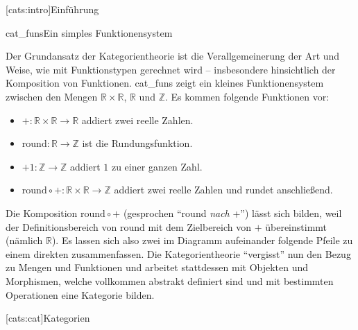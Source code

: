 \documentclass[11pt, a4paper, bibgerm]{scrbook}
\newcommand\lsection{}
\newcommand\abb{}
\newcommand\fig{}
\newcommand\ato{\rightarrow} %
\begin{document}
\lsection[cats:intro]{Einführung}

\fig{cat_funs}{Ein simples Funktionensystem}

Der Grundansatz der Kategorientheorie ist die Verallgemeinerung der
Art und Weise, wie mit Funktionstypen gerechnet wird -- insbesondere
hinsichtlich der Komposition von Funktionen. \abb{cat_funs} zeigt ein
kleines Funktionensystem zwischen den Mengen $\mathbb{R} \times
\mathbb{R}$, $\mathbb{R}$ und $\mathbb{Z}$. Es kommen folgende
Funktionen vor:
\begin{itemize}
\item $+ : \mathbb{R} \times \mathbb{R} \ato \mathbb{R}$ addiert zwei
  reelle Zahlen.
\item $\mathrm{round} : \mathbb{R} \ato \mathbb{Z}$ ist die
  Rundungsfunktion.
\item $+1 : \mathbb{Z} \ato \mathbb{Z}$ addiert $1$ zu einer ganzen Zahl.
\item $\mathrm{round} \circ + : \mathbb{R} \times \mathbb{R} \ato \mathbb{Z}$
  addiert zwei reelle Zahlen und rundet anschließend.
\end{itemize}

Die Komposition $\mathrm{round} \circ +$ (gesprochen "`round \textit{nach}
+"') lässt sich bilden, weil der Definitionsbereich von $\mathrm{round}$
mit dem Zielbereich von $+$ übereinstimmt (nämlich $\mathbb{R}$). Es
lassen sich also zwei im Diagramm aufeinander folgende Pfeile zu einem
direkten zusammenfassen. Die Kategorientheorie "`vergisst"' nun den
Bezug zu Mengen und Funktionen und arbeitet stattdessen mit Objekten
und Morphismen, welche vollkommen abstrakt definiert sind und mit
bestimmten Operationen eine Kategorie bilden.

\lsection[cats:cat]{Kategorien}
\end{document}
